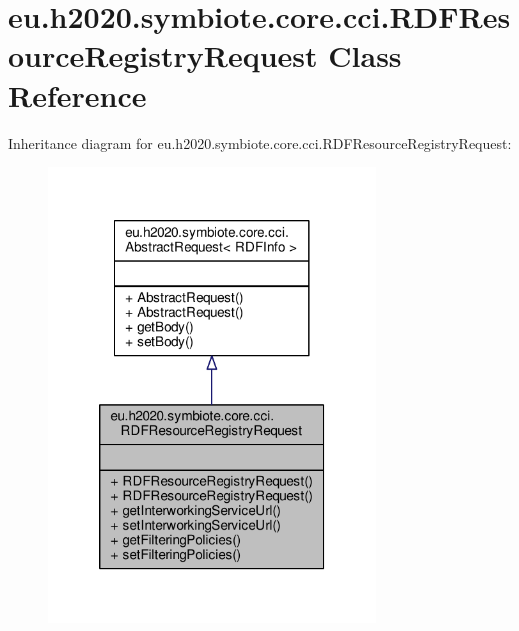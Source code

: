 \hypertarget{classeu_1_1h2020_1_1symbiote_1_1core_1_1cci_1_1RDFResourceRegistryRequest}{}\section{eu.\+h2020.\+symbiote.\+core.\+cci.\+R\+D\+F\+Resource\+Registry\+Request Class Reference}
\label{classeu_1_1h2020_1_1symbiote_1_1core_1_1cci_1_1RDFResourceRegistryRequest}


Inheritance diagram for eu.\+h2020.\+symbiote.\+core.\+cci.\+R\+D\+F\+Resource\+Registry\+Request\+:\nopagebreak
\begin{figure}[H]
\begin{center}
\leavevmode
\includegraphics[width=246pt]{classeu_1_1h2020_1_1symbiote_1_1core_1_1cci_1_1RDFResourceRegistryRequest__inherit__graph}
\end{center}
\end{figure}


